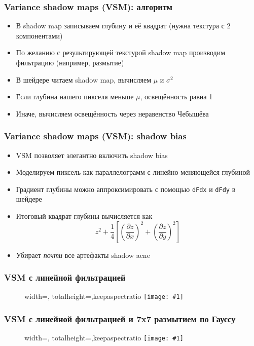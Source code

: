 \documentclass[10pt]{beamer}
\newcommand{\slideimage}[1]{
  \begin{figure}
    \begin{adjustbox}{width=\textwidth, totalheight=\textheight-2\baselineskip-2\baselineskip,keepaspectratio}
      \texttt{[image: \#1]}
    \end{adjustbox}
  \end{figure}
}
\begin{document}
\begin{frame}[fragile]
\frametitle{Variance shadow maps (VSM): алгоритм}
\begin{itemize}
\item В shadow map записываем глубину и её квадрат (нужна текстура с 2 компонентами)
\pause
\item По желанию с результирующей текстурой shadow map производим фильтрацию (например, размытие)
\pause
\item В шейдере читаем shadow map, вычисляем \begin{math}\mu\end{math} и \begin{math}\sigma^2\end{math}
\pause
\item Если глубина нашего пикселя меньше \begin{math}\mu\end{math}, освещённость равна 1
\pause
\item Иначе, вычисляем освещённость через неравенство Чебышёва
\end{itemize}
\end{frame}

\begin{frame}[fragile]
\frametitle{Variance shadow maps (VSM): shadow bias}
\begin{itemize}
\item VSM позволяет элегантно включить shadow bias
\pause
\item Моделируем пиксель как параллелограмм с линейно меняющейся глубиной
\pause
\item Градиент глубины можно аппроксимировать с помощью \verb|dFdx| и \verb|dFdy| в шейдере
\pause
\item Итоговый квадрат глубины вычисляется как
\begin{equation}
z^2 + \frac{1}{4}\left[\left(\frac{\partial z}{\partial x}\right)^2 + \left(\frac{\partial z}{\partial y}\right)^2\right]
\end{equation}
\pause
\item Убирает \textit{почти} все артефакты shadow acne
\end{itemize}
\end{frame}

\begin{frame}[fragile]
\frametitle{VSM с линейной фильтрацией}
\slideimage{vsm.png}
\end{frame}

\begin{frame}[fragile]
\frametitle{VSM с линейной фильтрацией и 7x7 размытием по Гауссу}
\slideimage{vsm_gauss.png}
\end{frame}
\end{document}
